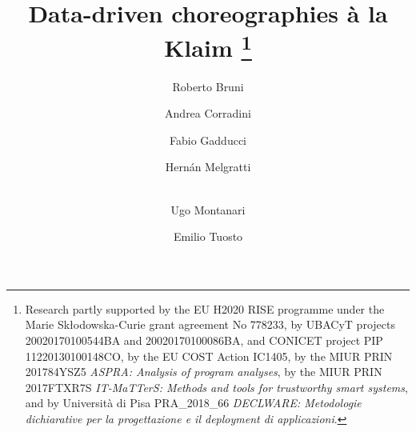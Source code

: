 \documentclass[runningheads,a4paper]{llncs}
\begin{document}
\mainmatter  %

\title{
  \iffinal
  Data-driven choreographies \`a la Klaim
  \else
  \fi
  \thanks{\scriptsize
    Research partly supported by
    the EU H2020 RISE programme under the Marie Skłodowska-Curie grant agreement No 778233,
    by UBACyT projects 20020170100544BA and 20020170100086BA,
    and CONICET project PIP 11220130100148CO,
    by the EU COST Action IC1405,
    by the MIUR PRIN 201784YSZ5 \emph{ASPRA: Analysis of program analyses},
    by the MIUR PRIN 2017FTXR7S \emph{IT-MaTTerS: Methods and tools for trustworthy smart systems},
    and
    by Universit\`a di Pisa PRA\_2018\_66  \emph{DECLWARE: Metodologie
      dichiarative per la progettazione e il deployment di applicazioni}.
  }
}


%
%

\author{
  Roberto Bruni  \and
  Andrea Corradini  \and
  Fabio Gadducci  \and
  Hern\'an Melgratti  \and
  \\
  Ugo Montanari  \and
  Emilio Tuosto
}

\iffinal
{}
\else
{}
\fi

\maketitle
\end{document}
